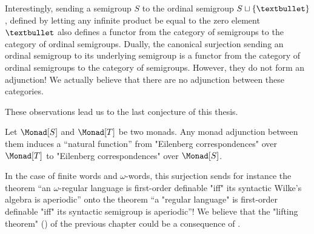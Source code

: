 Interestingly, sending a semigroup $S$ to the ordinal semigroup
$S \dcup \{\textbullet\}$, defined by letting any infinite product
be equal to the zero element $\textbullet$ also defines a functor
from the category of semigroups to the category of ordinal semigroups.
Dually, the canonical surjection sending an ordinal semigroup to
its underlying semigroup is a functor from
the category of ordinal semigroups to the category of semigroups.
However, they do not form an adjunction!
We actually believe that there are no adjunction between these categories.

These observations lead us to the last conjecture of this thesis.
\begin{conjecture}
	\AP\label{conj:projecting-algebraic-characterizations}
	Let $\Monad[S]$ and $\Monad[T]$ be two monads.
	Any monad adjunction between them induces
	a ``natural function'' from "Eilenberg correspondences" over $\Monad[T]$
	to "Eilenberg correspondences" over $\Monad[S]$.
\end{conjecture}

In the case of finite words and $\omega$-words, this
surjection sends for instance the theorem
``an $\omega$-regular language is first-order definable "iff" its
syntactic Wilke's algebra is aperiodic'' onto the theorem
``a "regular language" is first-order definable "iff" its
syntactic semigroup is aperiodic''!
We believe that the "lifting theorem" ()
of the previous chapter could be a consequence of
.